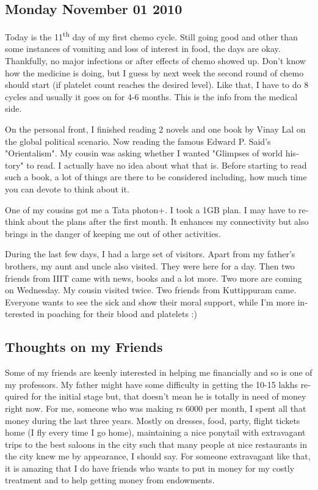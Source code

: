 \vskip 2pt
\begin{english}
\subsection*{Monday November 01 2010}

Today is the 11\textsuperscript{th} day of my first chemo cycle. Still going good and other
than some instances of vomiting and loss of interest in food, the days are okay.
Thankfully, no major infections or after effects of chemo showed up. 
Don't know how the medicine is doing, but I guess by next week the second 
round of chemo should start (if platelet count reaches the desired level). 
Like that, I have to do 8 cycles and usually it goes on for 4-6 months. 
This is the info from the medical side.

On the personal front, I finished reading 2 novels and one book by Vinay 
Lal on the global political scenario. Now reading the famous Edward P. Said's 
"Orientalism". My cousin was asking whether I wanted "Glimpses of world history" 
to read. I actually have no idea about what that is. Before starting to read such a book, 
a lot of things are there to be considered including, how much time you can devote to 
think about it. 

One of my cousins got me a Tata photon+. I took a 1GB plan. I may have to rethink 
about the plans after the first month. It enhances my connectivity but also brings 
in the danger of keeping me out of other activities.

During the last few days, I had a large set of visitors. Apart from my father's brothers,
my aunt and uncle also visited. They were here for a day. Then two friends from IIIT 
came with news, books and a lot more. Two more are coming on Wednesday. My cousin visited 
twice. Two friends from Kuttippuram came. Everyone wants to see the sick and 
show their moral support, while I'm more interested in poaching for their blood and 
platelets :) 

\subsection*{Thoughts on my Friends}

Some of my friends are keenly interested in helping me financially and so is one of my professors. 
My father might have some difficulty in getting the 10-15 lakhs required for the initial stage 
but, that doesn't mean he is totally in need of money right now. For me, someone who was making 
rs 6000 per month, I spent all that money during the last three years. Mostly on dresses, food, party, 
flight tickets home (I fly every time I go home), maintaining a nice ponytail with extravagant trips to the best 
saloons in the city such that many people at nice restaurants in the city knew me by appearance, I should say. 
For someone extravagant like that, it is amazing that I do have friends who wants to put in money 
for my costly treatment and to help getting money from endowments. 


\end{english}
